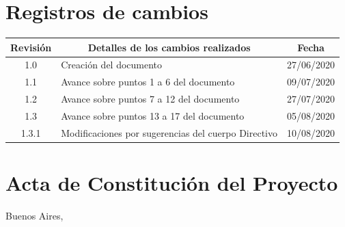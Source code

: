 \documentclass[11pt]{charter}
\begin{document}
\maketitle
\thispagestyle{empty}
\pagebreak


\thispagestyle{empty}
{\setlength{\parskip}{0pt}
\tableofcontents{}
}
\pagebreak


\section{Registros de cambios}
\label{sec:registro}


\begin{table}[ht]
\label{tab:registro}
\centering
\begin{tabularx}{\linewidth}{@{}|c|X|c|@{}}
\hline
\rowcolor[HTML]{C0C0C0} 
Revisión & \multicolumn{1}{c|}{\cellcolor[HTML]{C0C0C0}Detalles de los cambios realizados} & Fecha      \\ \hline
1.0      & Creación del documento                                          & 27/06/2020 \\ \hline
1.1      & Avance sobre puntos 1 a 6 del documento                                                               & 09/07/2020 \\ \hline
1.2      & Avance sobre puntos 7 a 12 del documento                                                               & 27/07/2020 \\ \hline
1.3      & Avance sobre puntos 13 a 17 del documento                                                               & 05/08/2020 \\ \hline
1.3.1    & Modificaciones por sugerencias del cuerpo Directivo                                                               & 10/08/2020 \\ \hline
\end{tabularx}
\end{table}

\pagebreak



\section{Acta de Constitución del Proyecto}
\label{sec:acta}

\begin{flushright}
Buenos Aires, \fechaInicioName
\end{flushright}

\vspace{2cm}
\end{document}
